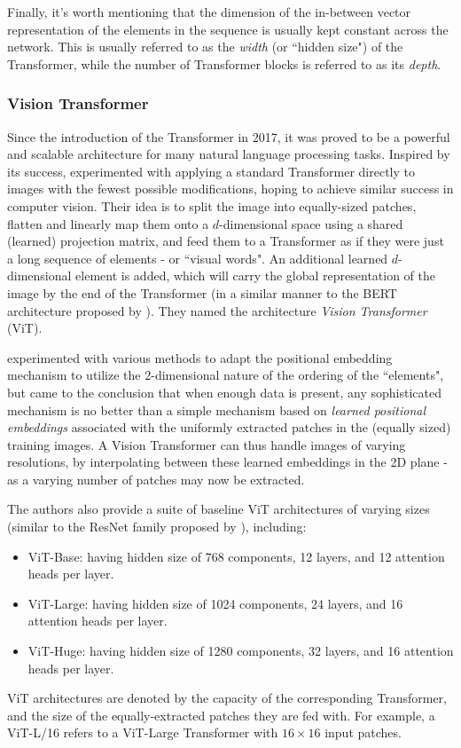 \documentclass{article}
\begin{document}
\medskip
\noindent
Finally, it's worth mentioning that the dimension of the in-between vector representation of the elements in the sequence is usually kept constant across the network. This is usually referred to as the \emph{width} (or ``hidden size") of the Transformer, while the number of Transformer blocks is referred to as its \emph{depth}.


\subsubsection{Vision Transformer}
\label{subsec:vit}

Since the introduction of the Transformer in 2017, it was proved to be a powerful and scalable architecture for many natural language processing tasks. Inspired by its success, \citet{dosovitskiy2020vit} experimented with applying a standard Transformer directly to images with the fewest possible modifications, hoping to achieve similar success in computer vision. Their idea is to split the image into equally-sized patches, flatten and linearly map them onto a $d$-dimensional space using a shared (learned) projection matrix, and feed them to a Transformer as if they were just a long sequence of elements - or ``visual words". An additional learned $d$-dimensional element is added, which will carry the global representation of the image by the end of the Transformer (in a similar manner to the BERT architecture proposed by \citet{devlin2018bert}). They named the architecture \emph{Vision Transformer} (ViT).

\medskip
\noindent
\citet{dosovitskiy2020vit} experimented with various methods to adapt the positional embedding mechanism to utilize the 2-dimensional nature of the ordering of the ``elements", but came to the conclusion that when enough data is present, any sophisticated mechanism is no better than a simple mechanism based on \emph{learned positional embeddings} associated with the uniformly extracted patches in the (equally sized) training images. A Vision Transformer can thus handle images of varying resolutions, by interpolating between these learned embeddings in the 2D plane - as a varying number of patches may now be extracted.

\medskip
\noindent
The authors also provide a suite of baseline ViT architectures of varying sizes (similar to the ResNet family proposed by \citet{he2016deep}), including:
\begin{itemize}
    \item
        ViT-Base: having hidden size of 768 components, 12 layers, and 12 attention heads per layer.
    \item
        ViT-Large: having hidden size of 1024 components, 24 layers, and 16 attention heads per layer.
    \item
        ViT-Huge: having hidden size of 1280 components, 32 layers, and 16 attention heads per layer.
\end{itemize}
ViT architectures are denoted by the capacity of the corresponding Transformer, and the size of the equally-extracted patches they are fed with. For example, a ViT-L/16 refers to a ViT-Large Transformer with $16 \times 16$ input patches.
\end{document}
